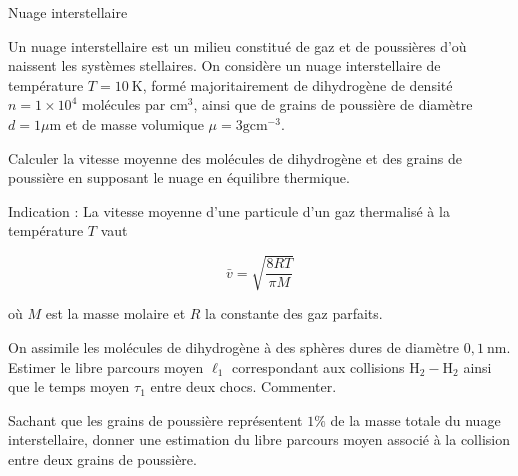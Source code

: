 \begin{exo}[PC][1][colle]{Nuage interstellaire}

  Un nuage interstellaire est un milieu constitué de gaz et de poussières d'où naissent les systèmes stellaires. On considère un nuage interstellaire de température $T=10 \mathrm{~K}$, formé majoritairement de dihydrogène de densité $n=1 \times 10^{4}$ molécules par $\mathrm{cm}^{3}$, ainsi que de grains de poussière de diamètre $d=1 \mu \mathrm{m}$ et de masse volumique $\mu=3 \mathrm{gcm}^{-3}$.

  \begin{quest}
    \item Calculer la vitesse moyenne des molécules de dihydrogène et des grains de poussière en supposant le nuage en équilibre thermique.

  Indication : La vitesse moyenne d'une particule d'un gaz thermalisé à la température $T$ vaut

  $$
  \bar{v}=\sqrt{\frac{8 R T}{\pi M}}
  $$

  où $M$ est la masse molaire et $R$ la constante des gaz parfaits.

    \item On assimile les molécules de dihydrogène à des sphères dures de diamètre $0,1 \mathrm{~nm}$. Estimer le libre parcours moyen $\ell_{1}$ correspondant aux collisions $\mathrm{H}_{2}-\mathrm{H}_{2}$ ainsi que le temps moyen $\tau_{1}$ entre deux chocs. Commenter.

    \item Sachant que les grains de poussière représentent $1 \%$ de la masse totale du nuage interstellaire, donner une estimation du libre parcours moyen associé à la collision entre deux grains de poussière.

  \end{quest}
\end{exo}

